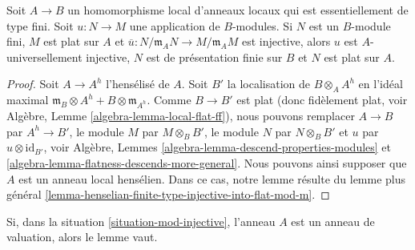 \begin{lemma}
\label{lemma-upstairs-finite-type-injective-into-flat-mod-m}
Soit $A \to B$ un homomorphisme local d'anneaux locaux qui est
essentiellement de type fini. Soit $u : N \to M$ une application de $B$-modules.
Si $N$ est un $B$-module fini, $M$ est plat sur $A$ et
$\overline{u} : N/\mathfrak m_A N \to M/\mathfrak m_A M$ est injective,
alors $u$ est $A$-universellement injective, $N$ est de présentation finie sur
$B$ et $N$ est plat sur $A$.
\end{lemma}

\begin{proof}
Soit $A \to A^h$ l'hensélisé de $A$. Soit $B'$ la localisation
de $B \otimes_A A^h$ en l'idéal maximal
$\mathfrak m_B \otimes A^h + B \otimes \mathfrak m_{A^h}$.
Comme $B \to B'$ est plat (donc fidèlement plat, voir
Algèbre, Lemme \ref{algebra-lemma-local-flat-ff}),
nous pouvons remplacer $A \to B$ par $A^h \to B'$,
le module $M$ par $M \otimes_B B'$, le module $N$ par $N \otimes_B B'$
et $u$ par $u \otimes \text{id}_{B'}$, voir
Algèbre, Lemmes \ref{algebra-lemma-descend-properties-modules} et
\ref{algebra-lemma-flatness-descends-more-general}.
Nous pouvons ainsi supposer que $A$ est un anneau local hensélien.
Dans ce cas, notre lemme résulte du lemme plus général
\ref{lemma-henselian-finite-type-injective-into-flat-mod-m}.
\end{proof}

\begin{lemma}
\label{lemma-valuation-ring-finite-type-injective-into-flat-mod-m}
Si, dans la situation \ref{situation-mod-injective}, l'anneau $A$ est un
anneau de valuation, alors le lemme vaut.
\end{lemma}

